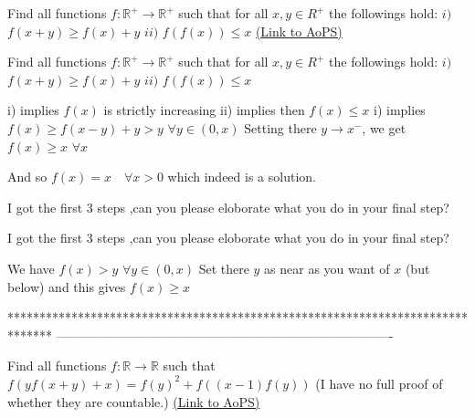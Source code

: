 \begin{problem}
	Find all functions $f:\mathbb{R^+}\to\mathbb {R^+} $ such that for all $x,y\in R^+$ the followings hold:
$i) $ $f (x+y)\ge f (x)+y $
$ii) $ $f (f (x))\le x $
	\flushright \href{https://artofproblemsolving.com/community/c6h1635355}{(Link to AoPS)}
\end{problem}



\begin{solution}
	\begin{tcolorbox}Find all functions $f:\mathbb{R^+}\to\mathbb {R^+} $ such that for all $x,y\in R^+$ the followings hold:
$i) $ $f (x+y)\ge f (x)+y $
$ii) $ $f (f (x))\le x $\end{tcolorbox}
i) implies $f(x)$ is strictly increasing
ii) implies then $f(x)\le x$
i) implies $f(x)\ge f(x-y)+y>y$ $\forall y\in(0,x)$
Setting there $y\to x^-$, we get $f(x)\ge x$ $\forall x$

And so $\boxed{f(x)=x\quad\forall x>0}$ which indeed is a solution.


\end{solution}



\begin{solution}
	I got the first 3 steps ,can you please eloborate what you do in your final step?
\end{solution}



\begin{solution}
	\begin{tcolorbox}I got the first 3 steps ,can you please eloborate what you do in your final step?\end{tcolorbox}

We have $f(x)>y$ $\forall y\in(0,x)$ 
Set there $y$ as near as you want of $x$ (but below) and this gives $f(x)\ge x$

\end{solution}
*******************************************************************************
-------------------------------------------------------------------------------

\begin{problem}
	Find all functions $f:\mathbb{R} \rightarrow \mathbb{R}$ such that $f(yf(x+y)+x)=f(y)^2+f((x-1)f(y))$
(I have no full proof of whether they are countable.)
	\flushright \href{https://artofproblemsolving.com/community/c6h1635535}{(Link to AoPS)}
\end{problem}



